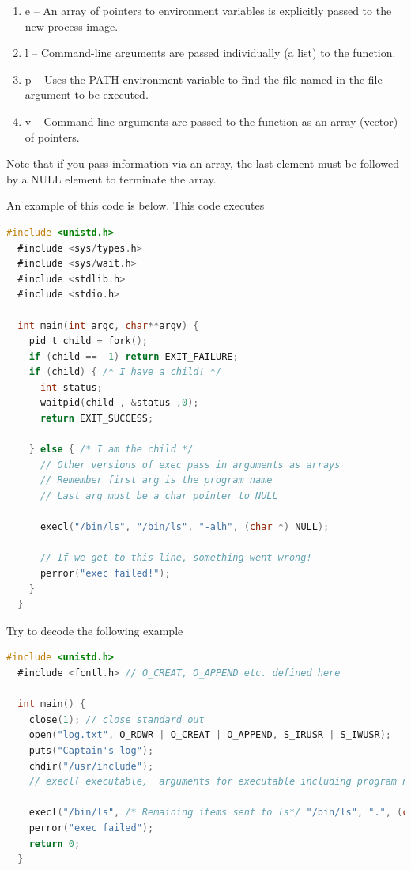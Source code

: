 \begin{itemize}
\begin{enumerate}
    \item e -- An array of pointers to environment variables is explicitly passed to the new process image.
    \item l -- Command-line arguments are passed individually (a list) to the function.
    \item p -- Uses the PATH environment variable to find the file named in the file argument to be executed.
    \item v -- Command-line arguments are passed to the function as an array (vector) of pointers.
\end{enumerate}

Note that if you pass information via an array, the last element must be followed by a NULL element to terminate the array.

An example of this code is below. This code executes 

\begin{lstlisting}[language=C]
  #include <unistd.h>
  #include <sys/types.h>
  #include <sys/wait.h>
  #include <stdlib.h>
  #include <stdio.h>

  int main(int argc, char**argv) {
    pid_t child = fork();
    if (child == -1) return EXIT_FAILURE;
    if (child) { /* I have a child! */
      int status;
      waitpid(child , &status ,0);
      return EXIT_SUCCESS;

    } else { /* I am the child */
      // Other versions of exec pass in arguments as arrays
      // Remember first arg is the program name
      // Last arg must be a char pointer to NULL

      execl("/bin/ls", "/bin/ls", "-alh", (char *) NULL);

      // If we get to this line, something went wrong!
      perror("exec failed!");
    }
  }
\end{lstlisting}

Try to decode the following example

\begin{lstlisting}[language=C]
  #include <unistd.h>
  #include <fcntl.h> // O_CREAT, O_APPEND etc. defined here

  int main() {
    close(1); // close standard out
    open("log.txt", O_RDWR | O_CREAT | O_APPEND, S_IRUSR | S_IWUSR);
    puts("Captain's log");
    chdir("/usr/include");
    // execl( executable,  arguments for executable including program name and NULL at the end)

    execl("/bin/ls", /* Remaining items sent to ls*/ "/bin/ls", ".", (char *) NULL); // "ls ."
    perror("exec failed");
    return 0;
  }
\end{lstlisting}


\end{itemize}
